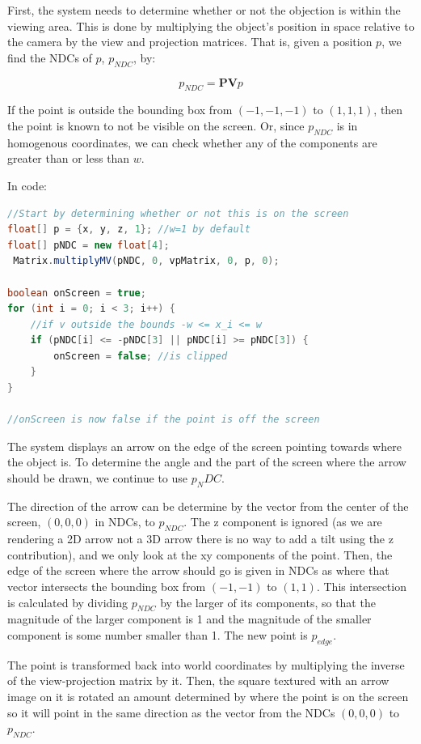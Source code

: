 First, the system needs to determine whether or not the objection is within the viewing area. This is done by multiplying the object's position in space relative to the camera by the view and projection matrices. That is, given a position $p$, we find the NDCs of $p$, $p_{NDC}$, by:

\[ p_{NDC} = \mathbf{P} \mathbf{V} p \]

If the point is outside the bounding box from $(-1, -1, -1)$ to $(1, 1, 1)$, then the point is known to not be visible on the screen. Or, since $p_{NDC}$ is in homogenous coordinates, we can check whether any of the components are greater than or less than $w$.

In code:

\begin{lstlisting}[language=Java]
//Start by determining whether or not this is on the screen
float[] p = {x, y, z, 1}; //w=1 by default
float[] pNDC = new float[4];
 Matrix.multiplyMV(pNDC, 0, vpMatrix, 0, p, 0);

boolean onScreen = true;
for (int i = 0; i < 3; i++) {
	//if v outside the bounds -w <= x_i <= w
	if (pNDC[i] <= -pNDC[3] || pNDC[i] >= pNDC[3]) {
		onScreen = false; //is clipped
	}
}

//onScreen is now false if the point is off the screen
\end{lstlisting}

The system displays an arrow on the edge of the screen pointing towards where the object is. To determine the angle and the part of the screen where the arrow should be drawn, we continue to use $p_NDC$.

The direction of the arrow can be determine by the vector from the center of the screen, $(0, 0, 0)$ in NDCs, to $p_{NDC}$. The z component is ignored (as we are rendering a 2D arrow not a 3D arrow there is no way to add a tilt using the z contribution), and we only look at the xy components of the point. Then, the edge of the screen where the arrow should go is given in NDCs as where that vector intersects the bounding box from $(-1, -1)$ to $(1, 1)$. This intersection is calculated by dividing $p_{NDC}$ by the larger of its components, so that the magnitude of the larger component is 1 and the magnitude of the smaller component is some number smaller than 1. The new point is $p_{edge}$.

The point is transformed back into world coordinates by multiplying the inverse of the view-projection matrix by it. Then, the square textured with an arrow image on it is rotated an amount determined by where the point is on the screen so it will point in the same direction as the vector from the NDCs $(0, 0, 0)$ to $p_{NDC}$. 


